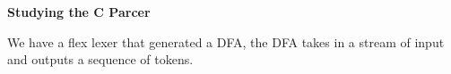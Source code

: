 \textbf{Studying the C Parcer}


We have a flex lexer that generated a DFA, the DFA takes in a stream of input and outputs a sequence of tokens.











